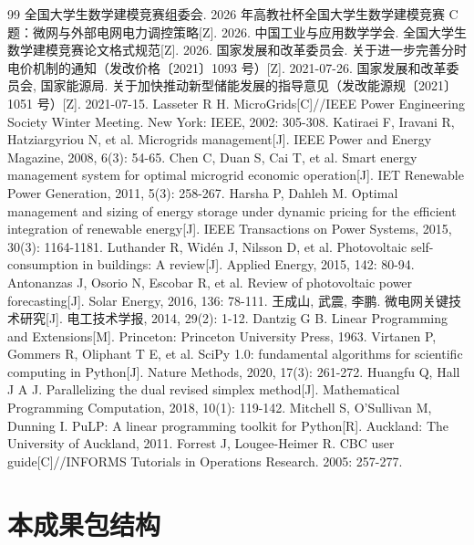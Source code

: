 \documentclass[12pt,a4paper]{ctexart}
\begin{document}
\begin{thebibliography}{99}
\small
{} 全国大学生数学建模竞赛组委会. 2026 年高教社杯全国大学生数学建模竞赛 C 题：微网与外部电网电力调控策略[Z]. 2026.
 中国工业与应用数学学会. 全国大学生数学建模竞赛论文格式规范[Z]. 2026.
 国家发展和改革委员会. 关于进一步完善分时电价机制的通知（发改价格〔2021〕1093 号）[Z]. 2021-07-26.
 国家发展和改革委员会, 国家能源局. 关于加快推动新型储能发展的指导意见（发改能源规〔2021〕1051 号）[Z]. 2021-07-15.
 Lasseter R H. MicroGrids[C]//IEEE Power Engineering Society Winter Meeting. New York: IEEE, 2002: 305-308.
 Katiraei F, Iravani R, Hatziargyriou N, et al. Microgrids management[J]. IEEE Power and Energy Magazine, 2008, 6(3): 54-65.
 Chen C, Duan S, Cai T, et al. Smart energy management system for optimal microgrid economic operation[J]. IET Renewable Power Generation, 2011, 5(3): 258-267.
 Harsha P, Dahleh M. Optimal management and sizing of energy storage under dynamic pricing for the efficient integration of renewable energy[J]. IEEE Transactions on Power Systems, 2015, 30(3): 1164-1181.
 Luthander R, Wid\'en J, Nilsson D, et al. Photovoltaic self-consumption in buildings: A review[J]. Applied Energy, 2015, 142: 80-94.
 Antonanzas J, Osorio N, Escobar R, et al. Review of photovoltaic power forecasting[J]. Solar Energy, 2016, 136: 78-111.
 王成山, 武震, 李鹏. 微电网关键技术研究[J]. 电工技术学报, 2014, 29(2): 1-12.
 Dantzig G B. Linear Programming and Extensions[M]. Princeton: Princeton University Press, 1963.
 Virtanen P, Gommers R, Oliphant T E, et al. SciPy 1.0: fundamental algorithms for scientific computing in Python[J]. Nature Methods, 2020, 17(3): 261-272.
 Huangfu Q, Hall J A J. Parallelizing the dual revised simplex method[J]. Mathematical Programming Computation, 2018, 10(1): 119-142.
 Mitchell S, O'Sullivan M, Dunning I. PuLP: A linear programming toolkit for Python[R]. Auckland: The University of Auckland, 2011.
 Forrest J, Lougee-Heimer R. CBC user guide[C]//INFORMS Tutorials in Operations Research. 2005: 257-277.
\end{thebibliography}

\appendix
\section{本成果包结构}
\end{document}
